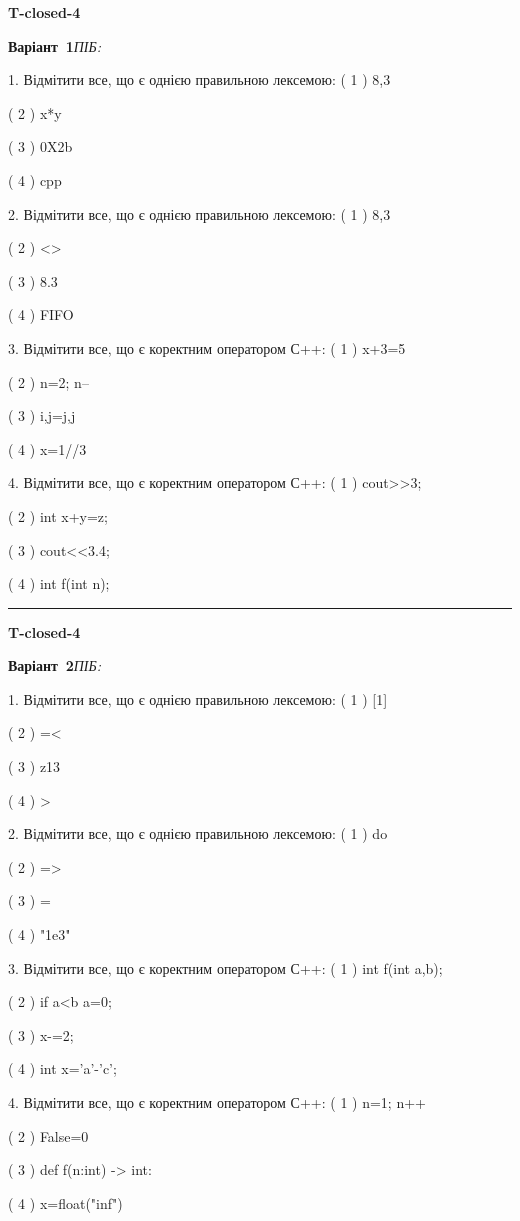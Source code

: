 \documentclass[11pt]{article}
\begin{document}
{\large\textbf{T-closed-4}}

\textbf{Варіант \No\,1}\hfill \textit{ПІБ:}\,\underline{\hspace{60mm}}
\vspace{4mm}

1. Відмітити все, що є однією правильною лексемою:
( 1 ) 8,3

( 2 ) x*y

( 3 ) 0X2b

( 4 ) cpp

2. Відмітити все, що є однією правильною лексемою:
( 1 ) 8,3

( 2 ) <>

( 3 ) 8.3

( 4 ) FIFO

3. Відмітити все, що є коректним оператором С++:
( 1 ) x+3=5

( 2 ) n=2; n--

( 3 ) i,j=j,j

( 4 ) x=1//3

4. Відмітити все, що є коректним оператором С++:
( 1 ) cout>>3;

( 2 ) int x+y=z;

( 3 ) cout<<3.4;

( 4 ) int f(int n);





\vspace{10mm}
\noindent\rule{\textwidth}{0.3pt}
\vspace{8mm}
{\large\textbf{T-closed-4}}

\textbf{Варіант \No\,2}\hfill \textit{ПІБ:}\,\underline{\hspace{60mm}}
\vspace{4mm}

1. Відмітити все, що є однією правильною лексемою:
( 1 ) [1]

( 2 ) =<

( 3 ) z13

( 4 ) >

2. Відмітити все, що є однією правильною лексемою:
( 1 ) do

( 2 ) =>

( 3 ) =

( 4 ) "1e3"

3. Відмітити все, що є коректним оператором С++:
( 1 ) int f(int a,b);

( 2 ) if a<b a=0;

( 3 ) x-=2;

( 4 ) int x='a'-'c';

4. Відмітити все, що є коректним оператором С++:
( 1 ) n=1; n++

( 2 ) False=0

( 3 ) def f(n:int) -> int:

( 4 ) x=float("inf")





\newpage
\end{document}
